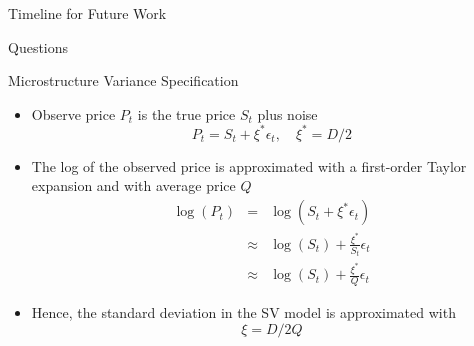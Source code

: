 \documentclass{beamer}
\begin{document}
\begin{frame}{Timeline for Future Work}

\begin{minipage}{1\textwidth}
\begin{centering}
\hspace{-4mm}
\end{centering}
\end{minipage}

\end{frame}





\begin{frame}{Questions}

\end{frame}





\begin{frame}{Microstructure Variance Specification}
\begin{itemize}
	\item Observe price $P_t$ is the true price $S_t$ plus noise
\[ P_t = S_t + \xi^* \epsilon_t, \quad \xi^* = D/2  \]

	\item The log of the observed price is approximated with a first-order Taylor expansion and with average price $Q$
\begin{eqnarray*}
	\log(P_t) &=& \log(S_t + \xi^* \epsilon_t) \\
		 &\approx& \log(S_t) + \frac{\xi^*}{S_t}\epsilon_t \\
		 &\approx& \log(S_t) + \frac{\xi^*}{Q}\epsilon_t
\end{eqnarray*}

	\item Hence, the standard deviation in the SV model is approximated with 
	\[ \boxed{\xi = D/2Q} \]
\end{itemize}

\end{frame}
\end{document}
